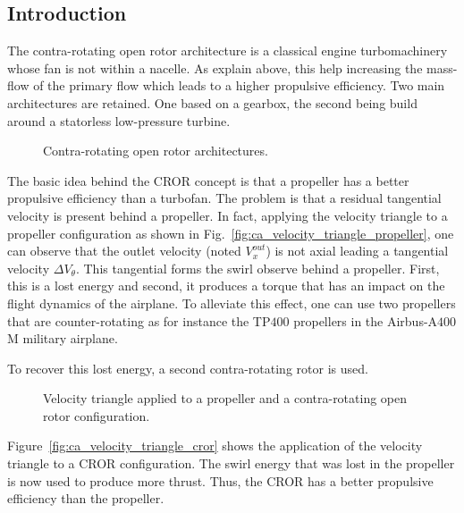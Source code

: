 
\subsection{Introduction}
\label{sub:ca_introduction}

The contra-rotating open rotor architecture is a classical engine
turbomachinery whose fan is not within a nacelle. As explain
above, this help increasing the mass-flow of the primary flow
which leads to a higher propulsive efficiency.
Two main architectures are retained. One based on a gearbox, the second
being build around a statorless low-pressure turbine.
\begin{figure}[htb]
  \centering
  \caption{Contra-rotating open rotor architectures.}
  \label{fig:ca_cror_designs}
\end{figure}

The basic idea behind the CROR concept is that a propeller has a 
better propulsive efficiency than a turbofan. The problem is that
a residual tangential velocity is present behind a propeller.
In fact, applying the velocity triangle to a propeller configuration
as shown in Fig.~\ref{fig:ca_velocity_triangle_propeller}, one can
observe that the outlet velocity (noted $V^{out}_x$) is not axial
leading a tangential velocity $\Delta V_{\theta}$. This tangential forms
the swirl observe behind a propeller. First, this is a lost energy and
second, it produces a torque that has an impact on the flight dynamics
of the airplane. To alleviate this effect, one can use two propellers
that are counter-rotating as for instance the TP$400$ propellers
in the Airbus-A$400$M military airplane.

To recover this lost energy, a second contra-rotating rotor is used.
\begin{figure}[htb]
  \centering
  \caption{Velocity triangle applied to a propeller and a 
  contra-rotating open rotor configuration.}
\end{figure}
Figure~\ref{fig:ca_velocity_triangle_cror} shows the application
of the velocity triangle to a CROR configuration. The swirl
energy that was lost in the propeller is now used to 
produce more thrust. Thus, the CROR has a better propulsive
efficiency than the propeller.

